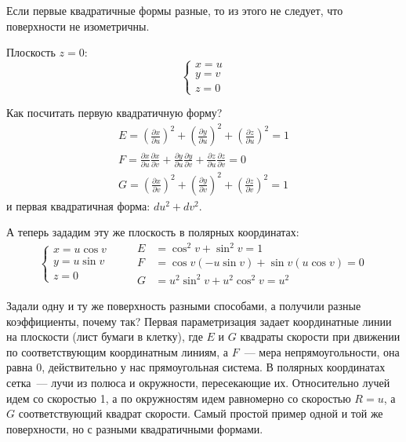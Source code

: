 \documentclass[main]{subfiles}
\begin{document}
\begin{remark}
    Если первые квадратичные формы разные, то из этого не следует, что поверхности не изометричны.
\end{remark}
\begin{example}
    Плоскость $z = 0$:
    \[\begin{cases}
            x = u \\
            y = v \\
            z = 0
        \end{cases}\]

    Как посчитать первую квадратичную форму?
    \begin{gather*}
        E = \left( \frac{\partial x}{\partial u}\right)^2 + \left(\frac{\partial y}{\partial u}\right)^2 + \left(\frac{\partial z}{\partial u}\right)^2 =1 \\
        F = \frac{\partial x}{\partial u}\frac{\partial x}{\partial v} +\frac{\partial y}{\partial u}\frac{\partial y}{\partial v} + \frac{\partial z}{\partial u}\frac{\partial z}{\partial v} = 0\\
        G = \left( \frac{\partial x}{\partial v}\right)^2 + \left(\frac{\partial y}{\partial v}\right)^2 + \left(\frac{\partial z}{\partial v}\right)^2 =1
    \end{gather*}
    и первая квадратичная форма: $du^2 + dv^2$.
\end{example}
\begin{example}
    А теперь зададим эту же плоскость в полярных координатах:
    \[\begin{cases}
            x = u \cos v \\
            y = u \sin v \\
            z = 0
        \end{cases}\qquad
        \begin{aligned}
            E & = \cos^2 v + \sin^2 v = 1                   \\
            F & = \cos v (-u \sin v) + \sin v (u\cos v) = 0 \\
            G & = u^2 \sin^2v + u^2 \cos^2 v = u^2
        \end{aligned}\]
\end{example}
Задали одну и ту же поверхность разными способами, а получили разные коэффициенты, почему так?
Первая параметризация задает координатные линии на плоскости (лист бумаги в клетку),
где $E$ и $G$ квадраты скорости при движении по соответствующим координатным линиям, а $F$~--- мера непрямоугольности, она равна 0, действительно у нас прямоугольная система.
В полярных координатах сетка~--- лучи из полюса и окружности, пересекающие их.
Относительно лучей идем со скоростью 1, а по окружностям идем равномерно со скоростью $R=u$, а $G$ соответствующий квадрат скорости.
Самый простой пример одной и той же поверхности, но с разными квадратичными формами.
\end{document}
